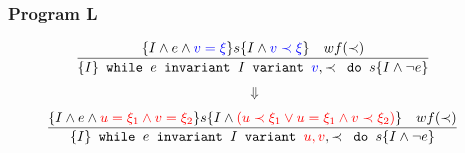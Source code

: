 \begin{frame}[containsverbatim]
  \frametitle{Program L}
\begin{align*}
  &\frac{
    \{I \land e \land \textcolor{blue}{v = \xi} \} s \{I \land \textcolor{blue}{v \prec \xi} \} \quad wf(\prec)
  }{
    \{I\} \texttt{ while } e \texttt{ invariant } I
          \texttt{ variant } \textcolor{blue}{v}, \prec \texttt{ do } s \{I \land \neg e\}
  }
\end{align*}
\begin{align*}
  \Downarrow &
\end{align*}
\begin{align*}
  &\frac{
    \{I \land e \land \textcolor{red}{u = \xi_{1} \land v = \xi_{2}} \} s \{I \land \textcolor{red}{(u \prec \xi_{1} \lor u = \xi_{1} \land v \prec \xi_{2})} \} \quad wf(\prec)
  }{
    \{I\} \texttt{ while } e \texttt{ invariant } I
          \texttt{ variant } \textcolor{red}{u,v} , \prec \texttt{ do } s \{I \land \neg e\}
  }
\end{align*}
\\~\\
\\~\\
\\~\\
\\~\\
\\~\\
\\~\\
\\~\\
\\~\\
\\~\\
\\~\\
\\~\\
\\~\\
\\~\\
\end{frame}

